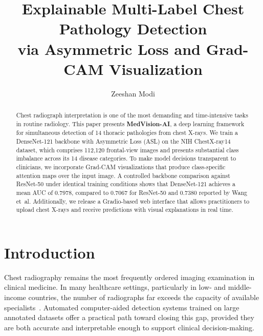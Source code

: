 \documentclass[runningheads]{llncs}
\begin{document}
\title{Explainable Multi-Label Chest Pathology Detection\\
via Asymmetric Loss and Grad-CAM Visualization}

\author{Zeeshan Modi}



\maketitle

\begin{abstract}
Chest radiograph interpretation is one of the most demanding and
time-intensive tasks in routine radiology. This paper presents
\textbf{MedVision-AI}, a deep learning framework for simultaneous
detection of 14 thoracic pathologies from chest X-rays. We train
a DenseNet-121 backbone with Asymmetric Loss (ASL) on the NIH
ChestX-ray14 dataset, which comprises 112,120 frontal-view images
and presents substantial class imbalance across its 14 disease
categories. To make model decisions transparent to clinicians, we
incorporate Grad-CAM visualizations that produce class-specific
attention maps over the input image. A controlled backbone
comparison against ResNet-50 under identical training conditions
shows that DenseNet-121 achieves a mean AUC of 0.7978, compared
to 0.7067 for ResNet-50 and 0.7380 reported by Wang et~al.
Additionally, we release a Gradio-based web interface that allows
practitioners to upload chest X-rays and receive predictions with
visual explanations in real time.
\end{abstract}


\section{Introduction}
\label{sec:intro}

Chest radiography remains the most frequently ordered imaging
examination in clinical medicine. In many healthcare settings,
particularly in low- and middle-income countries, the number of
radiographs far exceeds the capacity of available
specialists~\cite{wang2017chestxray14}. Automated computer-aided
detection systems trained on large annotated datasets offer a
practical path toward closing this gap, provided they are both
accurate and interpretable enough to support clinical decision-making.
\end{document}
